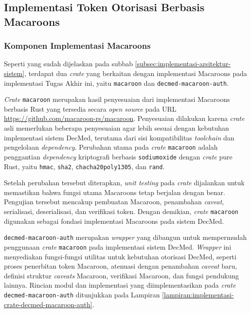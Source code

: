 \subsection{Implementasi Token Otorisasi Berbasis Macaroons}
\label{subsec:implementasi-token-macaroons}

\subsubsection{Komponen Implementasi Macaroons}
\label{subsubsec:komponen-implementasi-macaroons}

Seperti yang sudah dijelaskan pada subbab \ref{subsec:implementasi-arsitektur-sistem}, terdapat dua \textit{crate} yang berkaitan dengan implementasi Macaroons pada implementasi Tugas Akhir ini, yaitu \texttt{macaroon} dan \texttt{decmed-macaroon-auth}.

\textit{Crate} \texttt{macaroon} merupakan hasil penyesuaian dari implementasi Macaroons berbasis Rust yang tersedia secara \textit{open source} pada URL \url{https://github.com/macaroon-rs/macaroon}. Penyesuaian dilakukan karena \textit{crate} asli memerlukan beberapa penyesuaian agar lebih sesuai dengan kebutuhan implementasi sistem DecMed, terutama dari sisi kompatibilitas \textit{toolchain} dan pengelolaan \textit{dependency}. Perubahan utama pada \textit{crate} \texttt{macaroon} adalah penggantian \textit{dependency} kriptografi berbasis \texttt{sodiumoxide} dengan \textit{crate} pure Rust, yaitu \texttt{hmac}, \texttt{sha2}, \texttt{chacha20poly1305}, dan \texttt{rand}.

Setelah perubahan tersebut diterapkan, \textit{unit testing} pada \textit{crate} dijalankan untuk memastikan bahwa fungsi utama Macaroons tetap berjalan dengan benar. Pengujian tersebut mencakup pembuatan Macaroon, penambahan \textit{caveat}, serialisasi, deserialisasi, dan verifikasi token. Dengan demikian, \textit{crate} \texttt{macaroon} digunakan sebagai fondasi implementasi Macaroons pada sistem DecMed.

\texttt{decmed-macaroon-auth} merupakan \textit{wrapper} yang dibangun untuk mempermudah penggunaan \textit{crate} \texttt{macaroon} pada implementasi sistem DecMed. \textit{Wrapper} ini menyediakan fungsi-fungsi utilitas untuk kebutuhan otorisasi DecMed, seperti proses penerbitan token Macaroon, atenuasi dengan penambahan \textit{caveat} baru, definisi struktur \textit{caveats} Macaroon, verifikasi Macaroon, dan fungsi pendukung lainnya. Rincian modul dan implementasi yang diimplementasikan pada \textit{crate} \texttt{decmed-macaroon-auth} ditunjukkan pada Lampiran \ref{lampiran:implementasi-crate-decmed-macaroon-auth}.

